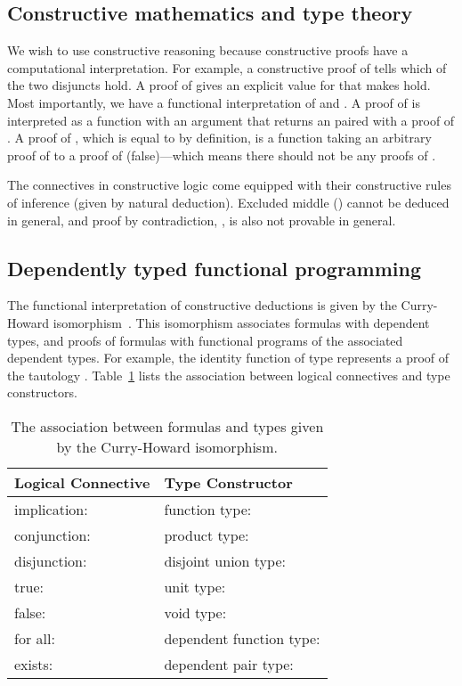 \documentclass{elsarticle}
\newcommand{\emdash}{---}
\newcommand{\tmstrong}[1]{\textbf{#1}}
\begin{document}
\subsection{\label{ss:constructiveMath}Constructive mathematics and type
theory}We wish to use constructive reasoning because constructive proofs have
a computational interpretation. For example, a constructive proof of  tells which of the two disjuncts hold. A proof of  gives an explicit value for  that makes  hold. Most
importantly, we have a functional interpretation of  and
. A proof of  is interpreted as a function with an argument  that returns an 
paired with a proof of . A proof of , which is equal to
 by definition, is a function taking an arbitrary
proof of  to a proof of  (false){\emdash}which means there
should not be any proofs of .

The connectives in constructive logic come equipped with their constructive
rules of inference (given by natural deduction){\cite{Sorensen}}. Excluded
middle () cannot be deduced in general, and proof
by contradiction, , is also not
provable in general.

\subsection{\label{ss:typeTheory}Dependently typed functional programming}The
functional interpretation of constructive deductions is given by the
Curry-Howard isomorphism~{\cite{Sorensen}}. This isomorphism associates
formulas with dependent types, and proofs of formulas with functional programs
of the associated dependent types. For example, the identity function  of type  represents a proof of the tautology . Table~\ref{C-H} lists the association between logical
connectives and type constructors.

\begin{table}[h]\begin{center}
  \begin{tabular}{|l|l|}
    \hline
    {\tmstrong{Logical Connective}} & {\tmstrong{Type Constructor}}\\
    \hline
    implication:  & function type: \\
    \hline
    conjunction:  & product type: \\
    \hline
    disjunction:  & disjoint union type: \\
    \hline
    true:  & unit type: \\
    \hline
    false:  & void type: \\
    \hline
    for all:  & dependent function type: \\
    \hline
    exists:  & dependent pair type: \\
    \hline
  \end{tabular}\end{center}
  \caption{\label{C-H}The association between formulas and types given by the
  Curry-Howard isomorphism.}
\end{table}
\end{document}
